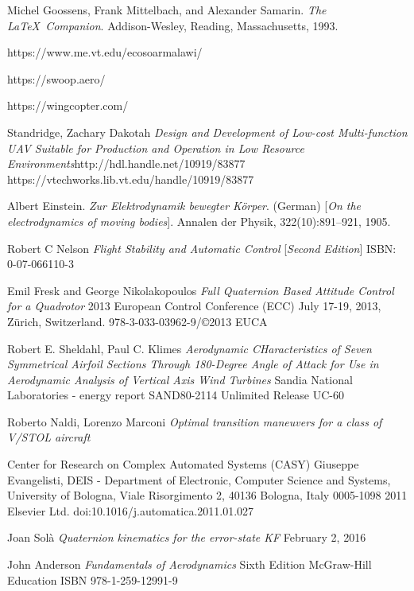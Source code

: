 \documentclass{article}
\begin{document}
\begin{thebibliography}{9}
Michel Goossens, Frank Mittelbach, and Alexander Samarin. 
\textit{The \LaTeX\ Companion}. 
Addison-Wesley, Reading, Massachusetts, 1993.

https://www.me.vt.edu/ecosoarmalawi/

https://swoop.aero/

https://wingcopter.com/

Standridge, Zachary Dakotah
\textit{Design and Development of Low-cost Multi-function UAV Suitable for Production and Operation in Low Resource Environments}http://hdl.handle.net/10919/83877
https://vtechworks.lib.vt.edu/handle/10919/83877


Albert Einstein. 
\textit{Zur Elektrodynamik bewegter K{\"o}rper}. (German) 
[\textit{On the electrodynamics of moving bodies}]. 
Annalen der Physik, 322(10):891–921, 1905.

Robert C Nelson
\textit{Flight Stability and Automatic Control}
[\textit{Second Edition}]
ISBN: 0-07-066110-3

Emil Fresk and George Nikolakopoulos
\textit{Full Quaternion Based Attitude Control for a Quadrotor}
2013 European Control Conference (ECC)
July 17-19, 2013, Zürich, Switzerland.
978-3-033-03962-9/©2013 EUCA

Robert E. Sheldahl, Paul C. Klimes
\textit{Aerodynamic CHaracteristics of Seven Symmetrical Airfoil Sections Through 180-Degree Angle of Attack for Use in Aerodynamic Analysis of Vertical Axis Wind Turbines}
Sandia National Laboratories - energy report
SAND80-2114 Unlimited Release UC-60

Roberto Naldi, Lorenzo Marconi
\textit{Optimal transition maneuvers for a class of V/STOL aircraft}

Center for Research on Complex Automated Systems (CASY) Giuseppe Evangelisti, DEIS - Department of Electronic, Computer Science and Systems, University of Bologna, Viale
Risorgimento 2, 40136 Bologna, Italy
0005-1098 
2011 Elsevier Ltd.
doi:10.1016/j.automatica.2011.01.027

Joan Sol\`{a}
\textit{Quaternion kinematics for the error-state KF}
February 2, 2016

John Anderson
\textit{Fundamentals of Aerodynamics}
Sixth Edition
McGraw-Hill Education
ISBN 978-1-259-12991-9


\end{thebibliography}
\end{document}
